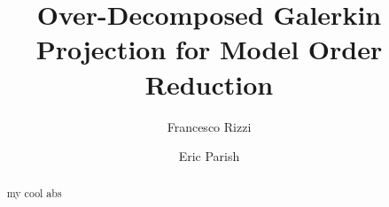 \documentclass[3p,computermodern,10pt]{elsarticle}
\begin{document}
\begin{frontmatter}

\title{Over-Decomposed Galerkin Projection for Model Order Reduction}
\author[a]{Francesco Rizzi}
\author[b]{Eric Parish}
\address[c]{John Tencer}
\address[b]{Patrick Blonigan}

\begin{abstract}
my cool abs
\end{abstract}

\end{frontmatter}





\clearpage
\begin{appendix}

\end{appendix}


\end{document}
